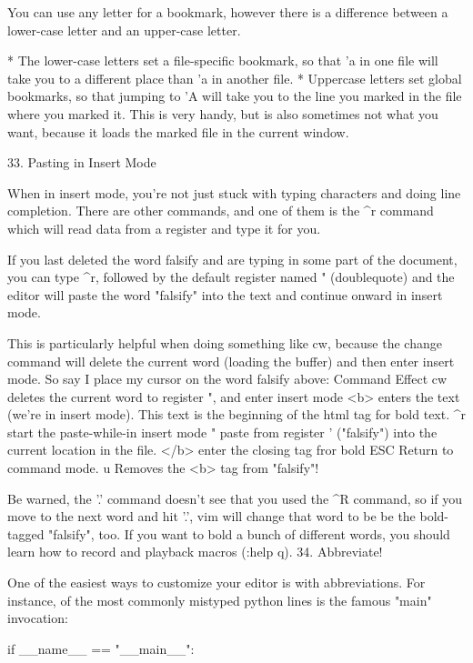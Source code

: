 \documentclass[a4paper, 12pt]{article}
\begin{document}
      You can use any letter for a bookmark, however there is a difference between a lower-case letter and an upper-case letter.

          * The lower-case letters set a file-specific bookmark, so that 'a in one file will take you to a different place than 'a in another file.
          * Uppercase letters set global bookmarks, so that jumping to 'A will take you to the line you marked in the file where you marked it. This is very handy, but is also sometimes not what you want, because it loads the marked file in the current window. 

  33. Pasting in Insert Mode

      When in insert mode, you're not just stuck with typing characters and doing line completion. There are other commands, and one of them is the ^r command which will read data from a register and type it for you.

      If you last deleted the word falsify and are typing in some part of the document, you can type ^r, followed by the default register named " (doublequote) and the editor will paste the word "falsify" into the text and continue onward in insert mode.

      This is particularly helpful when doing something like cw, because the change command will delete the current word (loading the buffer) and then enter insert mode. So say I place my cursor on the word falsify above:
      Command	Effect
      cw	deletes the current word to register ", and enter insert mode
      <b>	enters the text (we're in insert mode). This text is the beginning of the html tag for bold text.
      ^r	start the paste-while-in insert mode
      "	paste from register ' ("falsify") into the current location in the file.
      </b>	enter the closing tag fror bold
      ESC	Return to command mode.
      u	Removes the <b> tag from "falsify"!

      Be warned, the '.' command doesn't see that you used the ^R command, so if you move to the next word and hit '.', vim will change that word to be be the bold-tagged "falsify", too. If you want to bold a bunch of different words, you should learn how to record and playback macros (:help q).
  34. Abbreviate!

      One of the easiest ways to customize your editor is with abbreviations. For instance, of the most commonly mistyped python lines is the famous "main" invocation:

                  if __name__ == "__main__":
              
\end{document}
